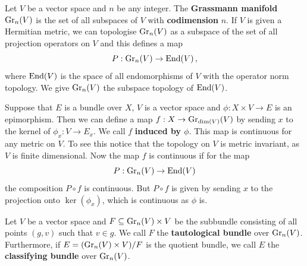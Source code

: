 \begin{definition} \label{def:kTheo-grassmanManifold}
	Let $V$ be a vector space and $n$ be any integer. The \textbf{Grassmann manifold} $\operatorname{\mathrm{Gr}}_n(V)$ is the set of all subspaces of $V$ with \textbf{codimension} $n$. If $V$ is given a Hermitian metric, we can topologise $\operatorname{\mathrm{Gr}}_n(V)$ as a subspace of the set of all projection operators on $V$ and this defines a map 
	\begin{equation*}
		P: \operatorname{\mathrm{Gr}}_n(V) \to \operatorname{\mathrm{End}}(V)\,,
	\end{equation*} where $\operatorname{\mathrm{End}}(V)$ is the space of all endomorphisms of $V$ with the operator norm topology.
	We give $\operatorname{\mathrm{Gr}}_n(V)$ the subspace topology of $\operatorname{\mathrm{End}}(V)$.
\end{definition}
\begin{definition}\label{def:kTheo-classifyingMap}
	Suppose that $E$ is a bundle over $X$, $V$ is a vector space and $\phi:X\times V \to E$ is an epimorphism. Then we can define a map $f:X\to \operatorname{\mathrm{Gr}}_{\dim(V)}(V)$ by sending $x$ to the kernel of $\phi_x: V\to E_x$. We call $f$ \textbf{induced by $\phi$}. This map is continuous for any metric on $V$. To see this notice that the topology on $V$ is metric invariant, as $V$ is finite dimensional. Now the map $f$ is continuous if for the map \begin{equation*}
		P: \operatorname{\mathrm{Gr}}_n(V) \to \operatorname{\mathrm{End}}(V)
	\end{equation*} the composition $P\circ f$ is continuous. But $P\circ f$ is given by sending $x$ to the projection onto $\ker(\phi_x)$, which is continuous as $\phi$ is.
\end{definition}
\begin{definition}\label{def:kTheo-classifyingBundle}
	Let $V$ be a vector space and $F\subseteq \operatorname{\mathrm{Gr}}_n(V)\times V$ be the subbundle consisting of all points $(g,v)$ such that $v\in g$. We call $F$ the \textbf{tautological bundle} over $\operatorname{\mathrm{Gr}}_n(V)$. Furthermore, if $E=(\operatorname{\mathrm{Gr}}_n(V)\times V)/F$ is the quotient bundle, we call $E$ the \textbf{classifying bundle} over $\operatorname{\mathrm{Gr}}_n(V)$.
\end{definition}

